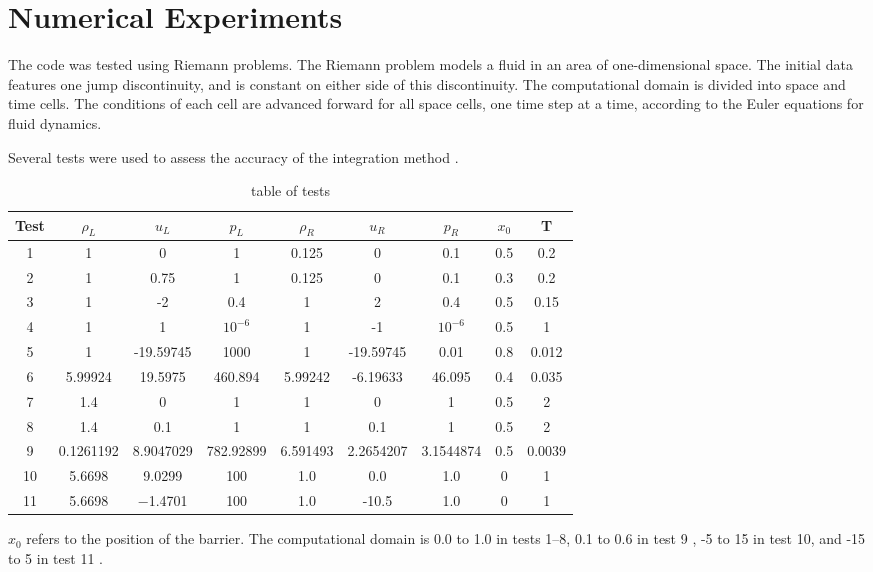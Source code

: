 \documentclass[10pt,preprint]{aastex}
\begin{document}
\section{Numerical Experiments}

The code was tested using Riemann problems. The Riemann problem models a fluid in an area of one-dimensional space. The initial data features one jump discontinuity, and is constant on either side of this discontinuity. The computational domain is divided into space and time cells. The conditions of each cell are advanced forward for all space cells, one time step at a time, according to the Euler equations for fluid dynamics. \citep{Leveque2002}


Several tests were used to assess the accuracy of the integration method \citep{LiskaWendroff2003}. 
\begin{table}[h!]
\begin{center}
\begin{tabular}{ |c|c c c|c c c|c c| }
 \hline
 Test & $\rho_L$ & $u_L$ & $p_L$ & $\rho_R$ & $u_R$ & $p_R$ & $x_0$ & T \\
 \hline
 1 & 1 & 0 & 1 & 0.125 & 0 & 0.1 & 0.5 & 0.2 \\
 2 & 1 & 0.75 & 1 & 0.125 & 0 & 0.1 & 0.3 & 0.2 \\
 3 & 1 & -2 & 0.4 & 1 & 2 & 0.4 & 0.5 & 0.15 \\
 4 & 1 & 1 & $10^{-6}$ & 1 & -1 & $10^{-6}$ & 0.5 & 1 \\
 5 & 1 & -19.59745 & 1000 & 1 & -19.59745 & 0.01 & 0.8 & 0.012 \\
 6 & 5.99924 & 19.5975 & 460.894 & 5.99242 & -6.19633 & 46.095 & 0.4 & 0.035 \\
 7 & 1.4 & 0 & 1 & 1 & 0 & 1 & 0.5 & 2 \\
 8 & 1.4 & 0.1 & 1 & 1 & 0.1 & 1 & 0.5 & 2 \\
 9 & 0.1261192 & 8.9047029 & 782.92899 & 6.591493 & 2.2654207 & 3.1544874 & 0.5 & 0.0039 \\
10 & 5.6698 & 9.0299 & 100 & 1.0 & 0.0 & 1.0 & 0 & 1 \\
11 & 5.6698 & −1.4701 & 100 & 1.0 & -10.5 & 1.0 & 0 & 1 \\
 \hline
\end{tabular}
  \caption{table of tests}
  \label{tab:testtable}
\end{center}
\end{table}
$x_0$ refers to the position of the barrier. The computational domain is 0.0 to 1.0 in tests 1--8, 0.1 to 0.6 in test 9 \citep{LiskaWendroff2003}, -5 to 15 in test 10, and -15 to 5 in test 11 \citep{Leveque2002}. 
\end{document}
